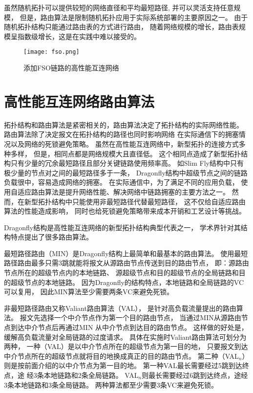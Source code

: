虽然随机拓扑可以提供较短的网络直径和平均最短路径,
并可以灵活支持任意规模，
但是，路由算法是限制随机拓扑应用于实际系统部署的主要原因之一。
由于随机拓扑结构只能通过路由表的方式进行路由，
随着网络规模的增长，路由表规模呈指数级增长，这是在实践中难以接受的。

\begin{figure}[htp]
\centering
\texttt{[image: fso.png]}
\caption{添加FSO链路的高性能互连网络}
\label{fso}
\end{figure}

\section{高性能互连网络路由算法}

拓扑结构和路由算法是紧密相关的，路由算法决定了拓扑结构的实际网络性能。
路由算法除了决定报文在拓扑结构的路径也同时影响网络
在实际通信下的拥塞情况以及网络的死锁避免策略。
虽然在高性能互连网络中，新型拓扑的连接方式多种多样，
但是，相同点都是网络规模大且直径低。
这个相同点造成了新型拓扑结构只有少量的冗余最短路径且部分关键链路使用频率高。
如Slim Fly结构中只有
极少量的节点对之间的最短路径多于一条，
Dragonfly结构中超级节点之间的链路负载很中，容易造成网络的拥塞。
在实际通信中，为了满足不同的应用负载，
使用自适应路由算法是提升网络性能、解决网络中链路拥塞的主要方法之一。
然而，在新型拓扑结构中只能使用非最短路径代替最短路径，
这不仅给自适应路由算法的性能造成影响，
同时也给死锁避免策略带来成本开销和工艺设计等挑战。

Dragonfly结构是高性能互连网络的新型拓扑结构典型代表之一，
学术界针对其结构特点提出了很多路由算法。

最短路径路由（MIN）是Dragonfly结构上最简单和最基本的路由算法。
使用最短路径路由最多只需3跳就能将报文从源路由节点传送到目的路由节点，
即：源路由节点所在的超级节点内的本地链路、
源超级节点和目的超级节点的全局链路和目的超级节点的本地链路。
因为Dragonfly的结构特点，本地链路和全局链路的VC可以复用，
因此MIN算法至少需要两条VC来避免死锁。

非最短路径路由又称Valiant路由算法（VAL），
是针对高负载流量提出的路由算法。
报文先选择一个中介节点作为第一个目的路由节点，
当通过MIN从源路由节点到达中介节点后再通过MIN 从中介节点到达目的路由节点。
这样做的好处是，缓解高负载流量对全局链路的过度请求。
具体在实施时Valiant路由算法可划分为两种，
一种（VAL）是以中介节点所在的超级节点为第一目的地，
只要报文到达中介节点所在的超级节点就将目的地换成真正的目的路由节点。
第二种（VAL$_n$）则是按前面介绍的以中介节点为第一目的地。
第一种VAL最长需要经过5跳到达终点，途
经3条本地链路和2条全局链路。
VAL$_n$则最长需要经过6跳到达终点，途经3条本地链路和3条全局链路。
两种算法都至少需要3条VC来避免死锁。

